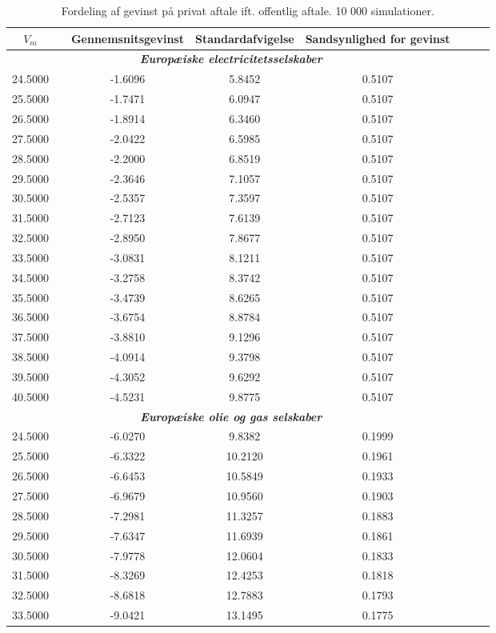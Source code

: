 \documentclass{article}
\begin{document}
\begin{table}[h]
	\caption{Fordeling af gevinst p\aa{} privat aftale ift. offentlig aftale. 10 000 simulationer.}
	\label{tab:rel_fordeling}
	\begin{tabularx}{0.95\linewidth}{cXcccccr}
	\toprule[1pt]
	$V_m$ && Gennemsnitsgevinst & Standardafvigelse & Sandsynlighed for gevinst\\
	\hline
\multicolumn{5}{c}{\emph{\textbf{Europæiske electricitetsselskaber}}} \\ 
24.5000&&-1.6096& 5.8452& 0.5107\\
25.5000&&-1.7471& 6.0947& 0.5107\\
26.5000&&-1.8914& 6.3460& 0.5107\\
27.5000&&-2.0422& 6.5985& 0.5107\\
28.5000&&-2.2000& 6.8519& 0.5107\\
29.5000&&-2.3646& 7.1057& 0.5107\\
30.5000&&-2.5357& 7.3597& 0.5107\\
31.5000&&-2.7123& 7.6139& 0.5107\\
32.5000&&-2.8950& 7.8677& 0.5107\\
33.5000&&-3.0831& 8.1211& 0.5107\\
34.5000&&-3.2758& 8.3742& 0.5107\\
35.5000&&-3.4739& 8.6265& 0.5107\\
36.5000&&-3.6754& 8.8784& 0.5107\\
37.5000&&-3.8810& 9.1296& 0.5107\\
38.5000&&-4.0914& 9.3798& 0.5107\\
39.5000&&-4.3052& 9.6292& 0.5107\\
40.5000&&-4.5231& 9.8775& 0.5107\\
\multicolumn{5}{c}{\emph{\textbf{Europæiske olie og gas selskaber}}} \\
24.5000&&-6.0270& 9.8382& 0.1999\\
25.5000&&-6.3322&10.2120& 0.1961\\
26.5000&&-6.6453&10.5849& 0.1933\\
27.5000&&-6.9679&10.9560& 0.1903\\
28.5000&&-7.2981&11.3257& 0.1883\\
29.5000&&-7.6347&11.6939& 0.1861\\
30.5000&&-7.9778&12.0604& 0.1833\\
31.5000&&-8.3269&12.4253& 0.1818\\
32.5000&&-8.6818&12.7883& 0.1793\\
33.5000&&-9.0421&13.1495& 0.1775\\

\end{tabularx}
\end{table}
\end{document}
